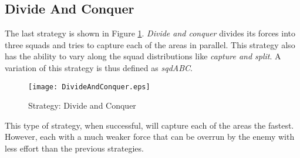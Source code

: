 \subsection{Divide And Conquer}
The last strategy is shown in Figure \ref{fig:dandc}. \emph{Divide and conquer}
divides its forces into three squads and tries to capture each of the areas in
parallel. This strategy also has the ability to vary along the squad
distributions like \emph{capture and split}. A variation of this strategy is
thus defined as \emph{sqdABC}.
\begin{figure}[!ht]
\centering
\texttt{[image: DivideAndConquer.eps]}
\caption{Strategy: Divide and Conquer}
\label{fig:dandc}
\end{figure}
This type of strategy, when successful, will capture each of the areas the fastest.
However, each with a much weaker force that can be overrun by the enemy with less
effort than the previous strategies.
